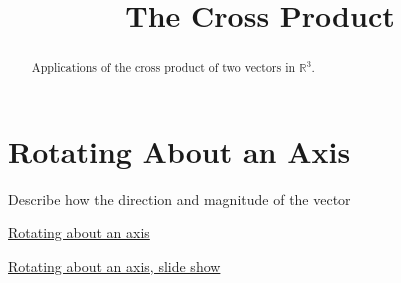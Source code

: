 \documentclass{ximera}
\title{The Cross Product}
\begin{document}
\begin{abstract}
Applications of the cross product of two vectors in $\mathbb{R}^3$.
\end{abstract}
\maketitle

\section{Rotating About an Axis}

\begin{question}  \label{Qdstjigvgf:Cross}
Describe how the direction and magnitude of the vector 

 
\begin{onlineOnly}
    \begin{center}
\end{center}
\end{onlineOnly}



\end{question}



\begin{exploration}



\href{https://www.desmos.com/3d/31f1fd3ffd}{Rotating about an axis}


\href{https://www.desmos.com/3d/a82ef238da}{Rotating about an axis, slide show}


\end{exploration}
\end{document}
